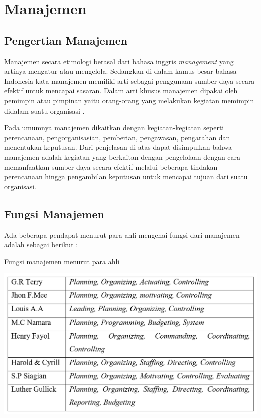 \section{Manajemen}

\subsection{Pengertian Manajemen}

Manajemen secara etimologi berasal dari bahasa inggris \emph{management} yang artinya mengatur atau mengelola. Sedangkan di dalam kamus besar bahasa Indonesia kata manajemen memiliki arti sebagai penggunaan sumber daya secara efektif untuk mencapai sasaran. Dalam arti khusus manajemen dipakai oleh pemimpin atau pimpinan yaitu orang-orang yang melakukan kegiatan memimpin didalam suatu organisasi \cite{syamsuddin}. 

Pada umumnya manajemen dikaitkan dengan kegiatan-kegiatan seperti perencanaan, pengorganisasian, pemberian, pengawasan, pengarahan dan menentukan keputusan. Dari penjelasan di atas dapat disimpulkan bahwa manajemen adalah kegiatan yang berkaitan dengan pengelolaan dengan cara memanfaatkan sumber daya secara efektif melalui beberapa tindakan perencanaan hingga pengambilan keputusan untuk mencapai tujuan dari suatu organisasi.

\subsection{Fungsi Manajemen}

Ada beberapa pendapat menurut para ahli mengenai fungsi dari manajemen adalah sebagai berikut \cite{rifai}: 

\begin{table}[H]
	\centering
	\caption{Fungsi manajemen menurut para ahli}
	\includegraphics[width=1.0\textwidth]{gambar/manajemenmenurutahli}
	\label{tabel_karaktermax2}
\end{table}

